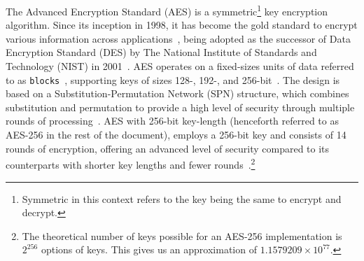 The Advanced Encryption Standard (AES) is a symmetric\footnote{
  Symmetric in this context refers to the key being the same to encrypt and
  decrypt.
} key encryption algorithm.
Since its inception in 1998, it has become the gold standard to encrypt various
information across applications~\cite{rijndael_book}, being adopted as the
successor of Data Encryption Standard (DES) by The National Institute of 
Standards and Technology (NIST) in 2001~\cite{nist_aes_winner}.
AES operates on a fixed-sizes units of data referred to as \texttt{blocks}~\cite{nistfips197blocks},
supporting keys of sizes 128-, 192-, and 256-bit~\cite{nistfips197intro}.
The design is based on a Substitution-Permutation Network (SPN) structure, which
combines substitution and permutation to provide a high level of security
through multiple rounds of processing~\cite{nistfips197specification}.
AES with 256-bit key-length (henceforth referred to as AES-256 in the rest
of the document), employs a 256-bit key and consists of 14 rounds of encryption,
offering an advanced level of security compared to its counterparts with shorter
key lengths and fewer rounds~\cite{nistfips197256}.\footnote{
  The theoretical number of keys possible for an AES-256 implementation is
  $2^{256}$ options of keys. This gives us an approximation of $1.1579209 \times 10^{77}$.
}